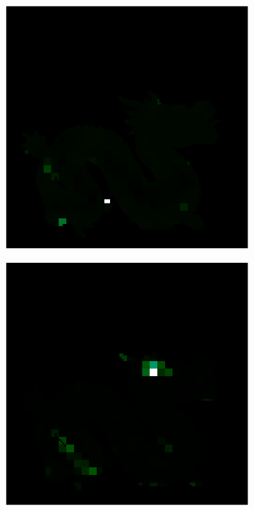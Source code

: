 \begin{figure}[H]
\begin{minipage}{0.32\linewidth}
	\end{minipage}
	\begin{minipage}{0.32\linewidth}
		\begin{subfigure}[t]{0.45\linewidth}
			\includegraphics[width=\linewidth]{./Figures/feature_map_gcnn/feature_map_gcnn-gcnn_4.png}
		\end{subfigure}
		\begin{subfigure}[t]{0.45\linewidth}
			\includegraphics[width=\linewidth]{./Figures/feature_map_gcnn/feature_map_gcnn-gcnn_5.png}
		\end{subfigure}
		

\end{minipage}
\end{figure}

